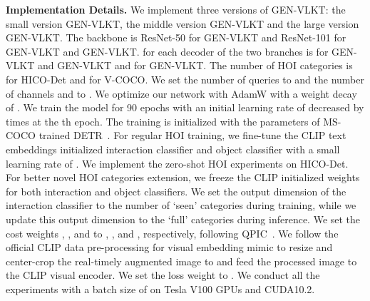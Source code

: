 \documentclass[10pt,twocolumn,letterpaper]{article}
\begin{document}
\noindent\textbf{Implementation Details.} We implement three versions of GEN-VLKT: the small version GEN-VLKT, the middle version GEN-VLKT and the large version GEN-VLKT. The backbone is ResNet-50 for GEN-VLKT and ResNet-101 for GEN-VLKT and GEN-VLKT.  for each decoder of the two branches is  for GEN-VLKT and GEN-VLKT and  for GEN-VLKT. The number of HOI categories  is  for HICO-Det and  for V-COCO. We set the number of queries  to  and the number of channels  and  to . We optimize our network with AdamW with a weight decay of . We train the model for 90 epochs with an initial learning rate of  decreased by  times at the th epoch. The training is initialized with the parameters of MS-COCO trained DETR~\cite{carion2020endtoend}. For regular HOI training, we fine-tune the CLIP text embeddings initialized interaction classifier and object classifier with a small learning rate of . We implement the zero-shot HOI experiments on HICO-Det. For better novel HOI categories extension, we freeze the CLIP initialized weights for both interaction and object classifiers. We set the output dimension of the interaction classifier to the number of `seen' categories during training, while we update this output dimension to the `full'  categories during inference. We set the cost weights , ,  and  to , ,  and , respectively, following QPIC~\cite{tamura2021qpic}. We follow the official CLIP data pre-processing for visual embedding mimic to resize and center-crop the real-timely augmented image to  and feed the processed image to the CLIP visual encoder. We set the loss weight  to . We conduct all the experiments with a batch size of  on  Tesla V100 GPUs and CUDA10.2.
\end{document}
